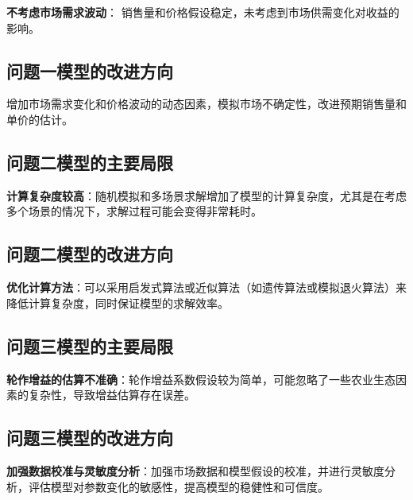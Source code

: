 \noindent\textbf{不考虑市场需求波动}： 销售量和价格假设稳定，未考虑到市场供需变化对收益的影响。
\subsection[\hspace{-2pt}问题一模型的改进方向]{{\heiti{} \hspace{-8pt}问题一模型的改进方向}}\label{subsection5: 问题一模型改进}
增加市场需求变化和价格波动的动态因素，模拟市场不确定性，改进预期销售量和单价的估计。
\subsection[\hspace{-2pt}问题二模型的主要局限]{{\heiti{} \hspace{-8pt}问题二模型的主要局限}}\label{subsection5: 问题二模型局限}


\noindent\textbf{计算复杂度较高}：随机模拟和多场景求解增加了模型的计算复杂度，尤其是在考虑多个场景的情况下，求解过程可能会变得非常耗时。

\subsection[\hspace{-2pt}问题二模型的改进方向]{{\heiti{} \hspace{-8pt}问题二模型的改进方向}}\label{subsection5: 问题二模型改进}


\noindent\textbf{优化计算方法}：可以采用启发式算法或近似算法（如遗传算法或模拟退火算法）来降低计算复杂度，同时保证模型的求解效率。


\subsection[\hspace{-2pt}问题三模型的主要局限]{{\heiti{} \hspace{-8pt}问题三模型的主要局限}}\label{subsection5: 问题三模型局限}


\noindent\textbf{轮作增益的估算不准确}：轮作增益系数假设较为简单，可能忽略了一些农业生态因素的复杂性，导致增益估算存在误差。

\subsection[\hspace{-2pt}问题三模型的改进方向]{{\heiti{} \hspace{-8pt}问题三模型的改进方向}}\label{subsection5: 问题三模型改进}


\noindent\textbf{加强数据校准与灵敏度分析}：加强市场数据和模型假设的校准，并进行灵敏度分析，评估模型对参数变化的敏感性，提高模型的稳健性和可信度。


